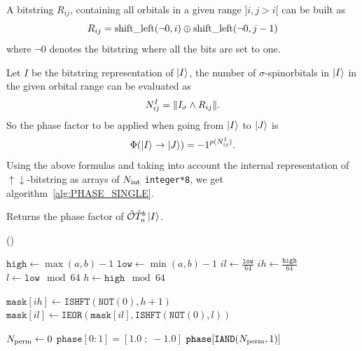 \documentclass[./thesis.tex]{subfiles}
\begin{document}
A bitstring $R_{ij}$, containing all orbitals in a given range $]i, j>i[$ can be built as 
\begin{equation}
R_{ij}=\text{shift\_left}(\neg{0},i) \oplus \text{shift\_left}(\neg{0},j-1)
\end{equation}
where $\neg{0}$ denotes the bitstring where all the bits are set to one.

Let $I$ be the bitstring representation of $\ket{I}$, the number of $\sigma$-spinorbitals in $\ket{I}$ in the given orbital range can be evaluated as
\begin{equation}
N^{I}_{ij} = \norm{I_{\sigma} \wedge R_{ij}}.
\end{equation}
So the phase factor to be applied when going from $\ket{I}$ to $\ket{J}$ is 
\begin{equation}
{\Phi \qty(\ket{I} \rightarrow \ket{J})} = -1^{p(N^I_{ij})}.
\end{equation}
Using the above formulas and taking into account the internal representation of $\uparrow \downarrow$-bitstring as arrays of ${N_\text{int}}$ \lstinline{integer*8}, we get algorithm~\ref{alg:PHASE_SINGLE}.   


\begin{algorithm}
	\caption{Returns the phase factor of ${\hat{\mathcal{O}}} {\hat{T}_{a}^{b}} \ket{I}$.}
	\label{alg:PHASE_SINGLE}
	
	\Fn(){}{
		$\texttt{high} \gets \max(a,b)-1$ \;
		$\texttt{low} \gets \min(a,b)-1$ \;
		$il \gets \frac{\texttt{low}}{64}$ \;
		$ih \gets \frac{\texttt{high}}{64}$ \;
		$l \gets \texttt{low} \mod 64$ \;
		$h \gets \texttt{high} \mod 64$ \; 

		
		$\texttt{mask}[ih] \gets \texttt{ISHFT}(\texttt{NOT}(0), h+1)$ \;
		$\texttt{mask}[il] \gets \texttt{IEOR}(\texttt{mask}[il], \texttt{ISHFT}(\texttt{NOT}(0), l))$ \;
		
		
		${N_\text{perm}} \gets 0$ \;
                $\texttt{phase}[0:1] = [ 1.0 \;;\; -1.0 ]$ \;
                \KwRet $\texttt{phase}[\texttt{IAND}({N_\text{perm}},1)]$ \;
		}
\end{algorithm}
\end{document}
